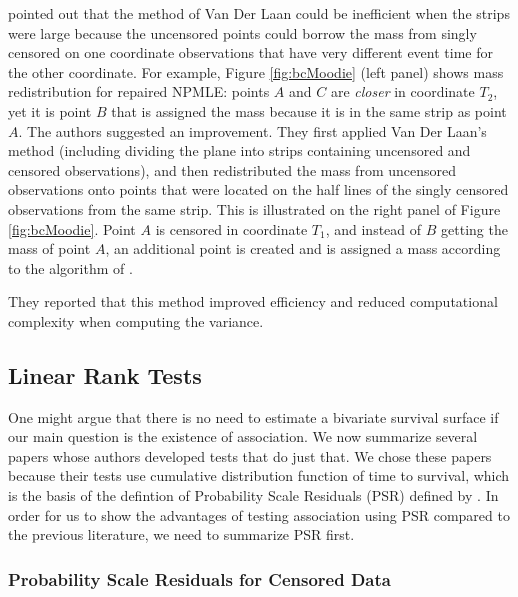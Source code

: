 \documentclass[]{article}
\begin{document}
\cite{moodie2005adjustment} pointed out that the method of Van Der Laan could be inefficient when the strips were large because the uncensored points could borrow the mass from singly censored on one coordinate observations that have very different event time for the other coordinate. For example, Figure \ref{fig:bcMoodie} (left panel) shows mass redistribution for repaired NPMLE: points $A$ and $C$ are \emph{closer} in coordinate $T_2$, yet it is point $B$ that is assigned the mass because it is in the same strip as point $A$. The authors suggested an improvement. They first applied Van Der Laan's method (including dividing the plane into strips containing uncensored and censored observations), and then redistributed the mass from uncensored observations onto points that were located on the half lines of the singly censored observations from the same strip. This is illustrated on the right panel of Figure \ref{fig:bcMoodie}. Point $A$ is censored in coordinate $T_1$, and instead of $B$ getting the mass of point $A$, an additional point is created and is assigned a mass according to the algorithm of \cite{moodie2005adjustment}.

They reported that this method improved efficiency and reduced computational complexity when computing the variance.


\subsection{Linear Rank Tests}
One might argue that there is no need to estimate a bivariate survival surface if our main question is the existence of association. We now summarize several papers whose authors developed tests that do just that. We chose these papers because their tests use cumulative distribution function of time to survival, which is the basis of the defintion of Probability Scale Residuals (PSR) defined by \cite{li2012new}. In order for us to show the advantages of testing association using PSR compared to the previous literature, we need to summarize PSR first.

\subsubsection{Probability Scale Residuals for Censored Data}
\end{document}
